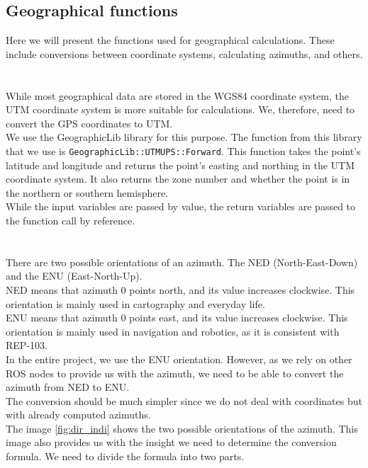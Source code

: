     \subsection{Geographical functions}
    \label{sec:geo_func}
        Here we will present the functions used for geographical calculations. These include conversions between coordinate systems, calculating azimuths, and others.\\\\
        \\
            While most geographical data are stored in the WGS84 coordinate system, the UTM coordinate system is more suitable for calculations. We, therefore, need to convert the GPS coordinates to UTM.\\
            We use the GeographicLib library for this purpose. The function from this library that we use is \texttt{GeographicLib::UTMUPS::Forward}. This function takes the point's latitude and longitude and returns the point's easting and northing in the UTM coordinate system. It also returns the zone number and whether the point is in the northern or southern hemisphere.\\
            While the input variables are passed by value, the return variables are passed to the function call by reference.\\\\
        \\
            There are two possible orientations of an azimuth. The NED (North-East-Down) and the ENU (East-North-Up).\\
            NED means that azimuth 0 points north, and its value increases clockwise. This orientation is mainly used in cartography and everyday life.\\
            ENU means that azimuth 0 points east, and its value increases clockwise. This orientation is mainly used in navigation and robotics, as it is consistent with REP-103\cite{REP-103}.\\
            In the entire project, we use the ENU orientation. However, as we rely on other ROS nodes to provide us with the azimuth, we need to be able to convert the azimuth from NED to ENU.\\
            The conversion should be much simpler since we do not deal with coordinates but with already computed azimuths.\\
            The image \ref{fig:dir_indi} shows the two possible orientations of the azimuth. This image also provides us with the insight we need to determine the conversion formula. We need to divide the formula into two parts.\\
